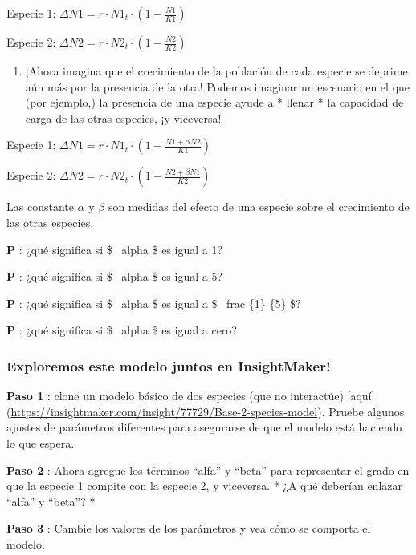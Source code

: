\documentclass[
]{article}
\providecommand{\tightlist}{%
  \setlength{\itemsep}{0pt}\setlength{\parskip}{0pt}}
\begin{document}
Especie 1: \(\Delta N1 = r\cdot N1_t \cdot (1-\frac{N1}{K1})\)

Especie 2: \(\Delta N2 = r\cdot N2_t \cdot (1-\frac{N2}{K2})\)

\begin{enumerate}
\def\labelenumi{\arabic{enumi}.}
\setcounter{enumi}{2}
\tightlist
\item
  ¡Ahora imagina que el crecimiento de la población de cada especie se
  deprime aún más por la presencia de la otra! Podemos imaginar un
  escenario en el que (por ejemplo,) la presencia de una especie ayude a
  * llenar * la capacidad de carga de las otras especies, ¡y viceversa!
\end{enumerate}

Especie 1: \(\Delta N1 = r\cdot N1_t \cdot (1-\frac{N1+\alpha N2}{K1})\)

Especie 2: \(\Delta N2 = r\cdot N2_t \cdot (1-\frac{N2+\beta N1}{K2})\)

Las constante \(\alpha\) y \(\beta\) son medidas del efecto de una
especie sobre el crecimiento de las otras especies.

\textbf{P }: ¿qué significa si \$ ~alpha \$ es igual a 1?

\textbf{P }: ¿qué significa si \$ ~alpha \$ es igual a 5?

\textbf{P }: ¿qué significa si \$ ~alpha \$ es igual a \$ ~frac \{1\}
\{5\} \$?

\textbf{P }: ¿qué significa si \$ ~alpha \$ es igual a cero?

\hypertarget{exploremos-este-modelo-juntos-en-insightmaker}{%
\subsubsection{Exploremos este modelo juntos en
InsightMaker!}\label{exploremos-este-modelo-juntos-en-insightmaker}}

\textbf{Paso 1 }: clone un modelo básico de dos especies (que no
interactúe) {[}aquí{]}
(\url{https://insightmaker.com/insight/77729/Base-2-species-model}).
Pruebe algunos ajustes de parámetros diferentes para asegurarse de que
el modelo está haciendo lo que espera.

\textbf{Paso 2 }: Ahora agregue los términos ``alfa'' y ``beta'' para
representar el grado en que la especie 1 compite con la especie 2, y
viceversa. * ¿A qué deberían enlazar ``alfa'' y ``beta''? *

\textbf{Paso 3 }: Cambie los valores de los parámetros y vea cómo se
comporta el modelo.
\end{document}
